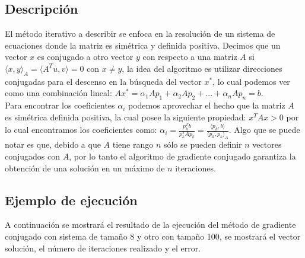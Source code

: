 \documentclass[12pt]{article}
\begin{document}
\subsection{Descripción}
El método iterativo a describir se enfoca en la resolución de un sistema de ecuaciones donde la matriz es simétrica y definida positiva. Decimos que un vector $x$ es conjugado a otro vector $y$ con respecto a una matriz $A$ si $\langle x,y \rangle _A = \langle A^Tu, v \rangle = 0$ con $x \neq y$, la idea del algoritmo es utilizar direcciones conjugadas para el descenso en la búsqueda del vector $x^*$, lo cual podemos ver como una combinación lineal: $Ax^* = \alpha_1 Ap_1 + \alpha_2 Ap_2 + ... + \alpha_n Ap_n = b$.\\
Para encontrar los coeficientes $\alpha_i$ podemos aprovechar el hecho que la matriz $A$ es simétrica definida positiva, la cual posee la siguiente propiedad: $x^TAx > 0$ por lo cual encontramos los coeficientes como: $\alpha_i = \frac{p_k^Tb}{p_k^TAp_k} = \frac{\langle p_k, b \rangle}{\langle p_k, p_k \rangle _A}$. Algo que se puede notar es que, debido a que $A$ tiene rango $n$ sólo se pueden definir $n$ vectores conjugados con $A$, por lo tanto el algoritmo de gradiente conjugado garantiza la obtención de una solución en un máximo de $n$ iteraciones.

\subsection{Ejemplo de ejecución}
A continuación se mostrará el resultado de la ejecución del método de gradiente conjugado con sistema de tamaño 8 y otro con tamaño 100, se mostrará el vector solución, el número de iteraciones realizado y el error.\\

\begin{figure}[H]
	\centering
	\hfill
\end{figure}

\begin{figure}[H]
	\centering
	\hfill
\end{figure}
\end{document}
